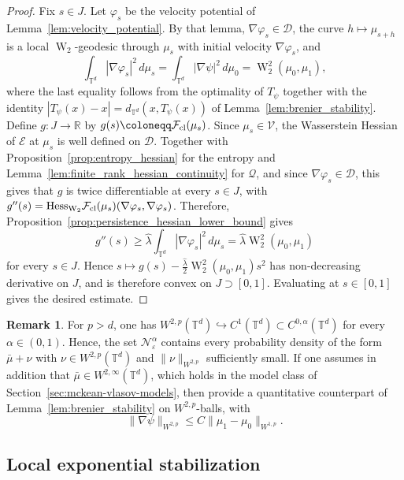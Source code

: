 \documentclass[11pt]{article}
\numberwithin{equation}{section}
\theoremstyle{definition}
\newtheorem{remark}[theorem]{Remark}
\newcommand{\R}{\mathbb{R}}
\newcommand{\T}{\mathbb{T}}
\newcommand{\F}{\mathcal{F}}
\newcommand{\E}{\mathcal{E}}
\newcommand{\Wtwo}{\operatorname{W}_2}
\newcommand{\Nbhd}{\mathcal{N}}
\begin{document}
\begin{proof}
    Fix $s \in J$. 
    Let $\varphi_s$ be the velocity potential of Lemma~\ref{lem:velocity_potential}.
    By that lemma, $\nabla \varphi_s \in \mathscr{D}$, the curve $h \mapsto \mu_{s+h}$ is a local $\Wtwo$-geodesic through $\mu_s$ with initial velocity $\nabla\varphi_s$, and
    \[
    \int_{\T^d} |\nabla\varphi_s|^2 \, d\mu_s = \int_{\T^d} |\nabla\psi|^2 \, d\mu_0 = \Wtwo^2(\mu_0,\mu_1),
    \]
    where the last equality follows from the optimality of $T_\psi$ together with the identity $|T_\psi(x) - x| = d_{\T^d}(x,T_\psi(x))$ of Lemma~\ref{lem:brenier_stability}.
    Define $g : J \to \R$ by $g(s) \coloneqq \F_{\rm cl}(\mu_s)$.
    Since $\mu_s \in \mathcal{V}$, the Wasserstein Hessian of $\E$ at $\mu_s$ is well defined on $\mathscr{D}$.
    Together with Proposition~\ref{prop:entropy_hessian} for the entropy and Lemma~\ref{lem:finite_rank_hessian_continuity} for $\mathcal{Q}$, and since $\nabla\varphi_s \in \mathscr{D}$, this gives that $g$ is twice differentiable at every $s \in J$, with $g''(s) = \mathrm{Hess}_{\Wtwo} \F_{\rm cl}(\mu_s)(\nabla\varphi_s, \nabla\varphi_s)$.
    Therefore, Proposition~\ref{prop:persistence_hessian_lower_bound} gives
    \[
    g''(s) \ge \hat{\lambda} \int_{\T^d} |\nabla\varphi_s|^2 \, d\mu_s = \hat{\lambda} \Wtwo^2(\mu_0,\mu_1)
    \]
    for every $s \in J$.
    Hence $s \mapsto g(s) - \frac{\hat{\lambda}}{2}\Wtwo^2(\mu_0,\mu_1)s^2$ has non-decreasing derivative on $J$, and is therefore convex on $J \supset [0,1]$.
    Evaluating at $s \in [0,1]$ gives the desired estimate.
\end{proof}

\begin{remark}
    For $p > d$, one has $W^{2,p}(\T^d) \hookrightarrow C^1(\T^d) \subset C^{0,\alpha}(\T^d)$ for every $\alpha \in (0,1)$.
    Hence, the set $\Nbhd^\alpha_\varepsilon$ contains every probability density of the form $\bar\mu + \nu$ with $\nu \in W^{2,p}(\T^d)$ and $\|\nu\|_{W^{2,p}}$ sufficiently small.
    If one assumes in addition that $\bar\mu \in W^{2,\infty}(\T^d)$, which holds in the model class of Section~\ref{sec:mckean-vlasov-models}, then \cite[Lemmas A.19--A.20]{seo2026local} provide a quantitative counterpart of Lemma~\ref{lem:brenier_stability} on $W^{2,p}$-balls, with
    \[
    \|\nabla\psi\|_{W^{2,p}} \le C\|\mu_1 - \mu_0\|_{W^{1,p}}.
    \]
\end{remark}

\subsection{Local exponential stabilization}
\label{sec:local-stab}
\end{document}
